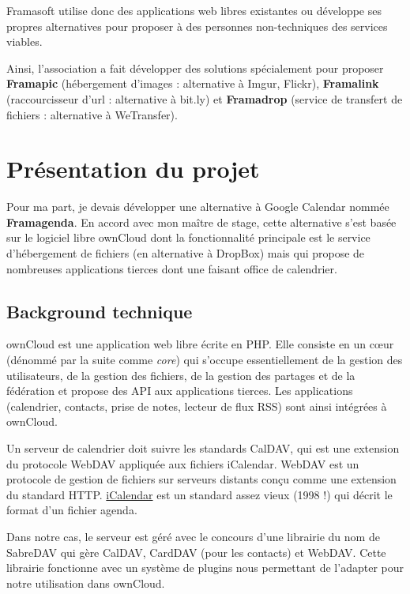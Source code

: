 \documentclass[10pt,a4paper]{report}
\begin{document}
	Framasoft utilise donc des applications web libres existantes ou développe ses propres alternatives pour proposer à des personnes non-techniques des services viables.
	
	Ainsi, l'association a fait développer des solutions spécialement pour proposer \textbf{Framapic} (hébergement d'images : alternative à Imgur, Flickr), \textbf{Framalink} (raccourcisseur d'url : alternative à bit.ly) et \textbf{Framadrop} (service de transfert de fichiers : alternative à WeTransfer).
	
	\section{Présentation du projet}
	
	Pour ma part, je devais développer une alternative à Google Calendar nommée \textbf{Framagenda}. En accord avec mon maître de stage, cette alternative s'est basée sur le logiciel libre ownCloud dont la fonctionnalité principale est le service d'hébergement de fichiers (en alternative à DropBox) mais qui propose de nombreuses applications tierces dont une faisant office de calendrier.
	
	\subsection{Background technique}
	ownCloud est une application web libre écrite en PHP. Elle consiste en un cœur (dénommé par la suite comme \textit{core}) qui s'occupe essentiellement de la gestion des utilisateurs, de la gestion des fichiers, de la gestion des partages et de la fédération et propose des API aux applications tierces. Les applications (calendrier, contacts, prise de notes, lecteur de flux RSS) sont ainsi intégrées à ownCloud.
	
	Un serveur de calendrier doit suivre les standards CalDAV, qui est une extension du protocole WebDAV appliquée aux fichiers iCalendar. WebDAV est un protocole de gestion de fichiers sur serveurs distants conçu comme une extension du standard HTTP. \href{https://tools.ietf.org/html/rfc2445}{iCalendar} est un standard assez vieux (1998 !) qui décrit le format d'un fichier agenda.
	
	Dans notre cas, le serveur est géré avec le concours d'une librairie du nom de SabreDAV qui gère CalDAV, CardDAV (pour les contacts) et WebDAV. Cette librairie fonctionne avec un système de plugins nous permettant de l'adapter pour notre utilisation dans ownCloud.
	
\end{document}
